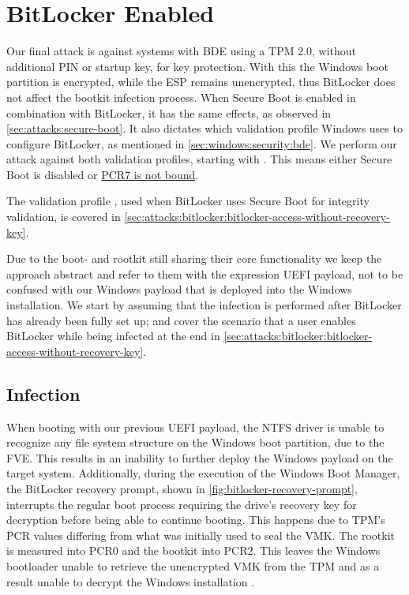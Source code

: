 \section{BitLocker Enabled}

Our final attack is against systems with \ac{BDE} using a \ac{TPM} 2.0, without additional \ac{PIN} or startup key, for key protection.
With this the Windows boot partition is encrypted, while the \ac{ESP} remains unencrypted, thus BitLocker does not affect the bootkit infection process.
When Secure Boot is enabled in combination with BitLocker, it has the same effects, as observed in \autoref{sec:attacks:secure-boot}.
It also dictates which validation profile Windows uses to configure BitLocker, as mentioned in \autoref{sec:windows:security:bde}.
We perform our attack against both validation profiles, starting with \hyperref[tab:pcr-usage]{}.
This means either Secure Boot is disabled or \hyperlink{pcr7-binding}{\ac{PCR}7 is not bound}.

The validation profile \hyperref[tab:pcr-usage]{}, used when BitLocker uses Secure Boot for integrity validation, is covered in \autoref{sec:attacks:bitlocker:bitlocker-access-without-recovery-key}.

Due to the boot- and rootkit still sharing their core functionality we keep the approach abstract and refer to them with the expression \ac{UEFI} payload, not to be confused with our Windows payload that is deployed into the Windows installation.
We start by assuming that the infection is performed after BitLocker has already been fully set up; and cover the scenario that a user enables BitLocker while being infected at the end in \autoref{sec:attacks:bitlocker:bitlocker-access-without-recovery-key}.

\subsection{Infection}

When booting with our previous \ac{UEFI} payload, the \ac{NTFS} driver is unable to recognize any file system structure on the Windows boot partition, due to the \ac{FVE}.
This results in an inability to further deploy the Windows payload on the target system.
Additionally, during the execution of the Windows Boot Manager, the BitLocker recovery prompt, shown in \autoref{fig:bitlocker-recovery-prompt}, interrupts the regular boot process requiring the drive's recovery key for decryption before being able to continue booting.
This happens due to \ac{TPM}'s \ac{PCR} values differing from what was initially used to seal the \ac{VMK}.
The rootkit is measured into \ac{PCR}0 and the bootkit into \ac{PCR}2.
This leaves the Windows bootloader unable to retrieve the unencrypted \ac{VMK} from the \ac{TPM} and as a result unable to decrypt the Windows installation \cite[Section 12]{windows-internals-7-part2}.


